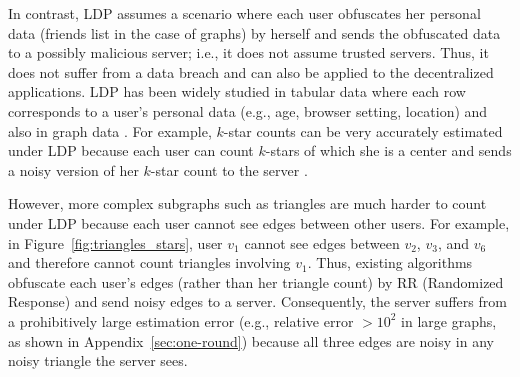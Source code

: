 In contrast, LDP assumes a scenario where each user obfuscates her personal data (friends list in 
the case of graphs) 
by herself and sends the obfuscated data to a possibly malicious server; i.e., it does not assume trusted servers.
Thus, it does not suffer from a data breach and can also be applied to the decentralized applications. 
LDP has been widely studied in tabular data where each row corresponds to a user's personal data (e.g., age, browser setting, location) 
\cite{Acharya_AISTATS19,Bassily_NIPS17,Erlingsson_CCS14,Kairouz_ICML16,Murakami_USENIX19,Wang_USENIX17} 
and also in graph data \cite{Imola_USENIX21,Qin_CCS17,Ye_ICDE20,Ye_TKDE21}.
For example, $k$-star counts can be very accurately estimated under LDP because each user can count $k$-stars of which she is a center and sends a noisy version of her $k$-star count to the server \cite{Imola_USENIX21}.

However, more complex subgraphs such as triangles are much harder to count under LDP because each user
cannot see
edges between other users.
For example, in Figure~\ref{fig:triangles_stars}, user $v_1$ cannot see
edges between $v_2$, $v_3$, and $v_6$ 
and therefore 
cannot count triangles involving $v_1$.
Thus,
existing algorithms \cite{Imola_USENIX21,Ye_ICDE20,Ye_TKDE21}
obfuscate each user's edges (rather than her triangle count) by
RR (Randomized Response)
\cite{Warner_JASA65} and send noisy edges to a server.
Consequently, the server suffers from a
prohibitively
large estimation error
(e.g., relative error $> 10^2$ in large graphs, 
as shown in Appendix~\ref{sec:one-round}) 
because all three edges are noisy in any noisy triangle the server sees.


